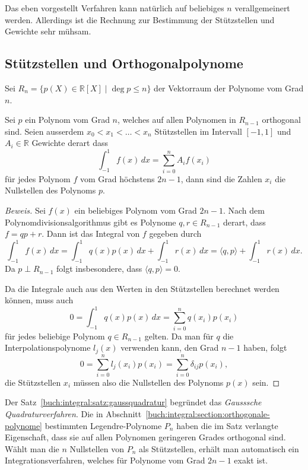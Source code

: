 Das eben vorgestellt Verfahren kann natürlich auf beliebiges $n$
verallgemeinert werden.
Allerdings ist die Rechnung zur Bestimmung der Stützstellen und
Gewichte sehr mühsam.

\subsection{Stützstellen und Orthogonalpolynome}
Sei $R_n=\{p(X)\in\mathbb{R}[X] \mid \deg p\le n\}$ der Vektorraum
der Polynome vom Grad $n$.

\begin{satz}
\label{buch:integral:satz:gaussquadratur}
Sei $p$ ein Polynom vom Grad $n$, welches auf allen Polynomen in $R_{n-1}$
orthogonal sind.
Seien ausserdem $x_0<x_1<\dots<x_n$ Stützstellen im Intervall $[-1,1]$ 
und $A_i\in\mathbb{R}$ Gewichte derart dass
\[
\int_{-1}^1 f(x)\,dx =
\sum_{i=0}^n A_if(x_i)
\]
für jedes Polynom $f$ vom Grad höchstens $2n-1$, dann sind die Zahlen
$x_i$ die Nullstellen des Polynoms $p$.
\end{satz}

\begin{proof}[Beweis]
Sei $f(x)$ ein beliebiges Polynom vom Grad $2n-1$.
Nach dem Polynomdivisionsalgorithmus gibt es
Polynome $q,r\in R_{n-1}$ derart, dass $f=qp+r$.
Dann ist das Integral von $f$ gegeben durch
\[
\int_{-1}^1 f(x)\,dx
=
\int_{-1}^1q(x) p(x)\,dx + \int_{-1}^1 r(x)\,dx
=
\langle q,p\rangle + \int_{-1}^1 r(x)\,dx.
\]
Da $p\perp R_{n-1}$ folgt insbesondere, dass $\langle q,p\rangle=0$.

Da die Integrale auch aus den Werten in den Stützstellen berechnet
werden können, muss auch
\[
0
=
\int_{-1}^1 q(x)p(x)\,dx
=
\sum_{i=0}^n q(x_i)p(x_i)
\]
für jedes beliebige Polynom $q\in R_{n-1}$ gelten.
Da man für $q$ die Interpolationspolynome $l_j(x)$ verwenden
kann, den Grad $n-1$ haben, folgt
\[
0
=
\sum_{i=0}^n
l_j(x_i)p(x_i)
=
\sum_{i=0}^n \delta_{ij}p(x_i),
\]
die Stützstellen $x_i$ müssen also die Nullstellen des Polynoms
$p(x)$ sein.
\end{proof}

Der Satz~\ref{buch:integral:satz:gaussquadratur} begründet das
{\em Gausssche Quadraturverfahren}.
Die in Abschnitt~\ref{buch:integral:section:orthogonale-polynome}
bestimmten Legendre-Polynome $P_n$ haben die im Satz
verlangte Eigenschaft,
dass sie auf allen Polynomen geringeren Grades orthogonal sind.
Wählt man die $n$ Nullstellen von $P_n$ als Stützstellen, erhält man 
automatisch ein Integrationsverfahren, welches für Polynome vom Grad
$2n-1$ exakt ist.

